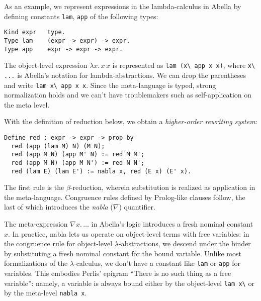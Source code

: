 \documentclass[a4paper, 11pt,titlepage, openright, twoside]{report}
\newcommand{\+}{\enspace}
\begin{document}
As an example, we represent expressions in the lambda-calculus in Abella by defining constants \lstinline{lam}, \lstinline{app} of the following types:
\begin{lstlisting}
Kind expr   type.
Type lam    (expr -> expr) -> expr.
Type app    expr -> expr -> expr.
\end{lstlisting}
The object-level expression $λx.\,x\,x$ is represented as \lstinline{lam (x\ app x x)},
where \lstinline{x\ ...} is Abella's notation for lambda-abstractions.
We can drop the parentheses and write \lstinline{lam x\ app x x}.
Since the meta-language is typed, strong normalization holds and we can't have troublemakers such
as self-application on the meta level.

With the definition of reduction below, we obtain a \textit{higher-order rewriting system}:
\begin{lstlisting}
Define red : expr -> expr -> prop by
  red (app (lam M) N) (M N);
  red (app M N) (app M' N) := red M M';
  red (app M N) (app M N') := red N N';
  red (lam E) (lam E') := nabla x, red (E x) (E' x).
\end{lstlisting}
The first rule is the $β$-reduction, wherein substitution is realized as application in the meta-language.
Congruence rules defined by Prolog-like clauses follow,
the last of which introduces the \textit{nabla} ($\nabla$) quantifier.

The meta-expression $\nabla x.\,…$ in Abella's logic introduces a fresh nominal constant $x$.
In practice, nabla lets us operate on object-level terms with free variables:
in the congruence rule for object-level $λ$-abstractions,
we descend under the binder by substituting a fresh nominal constant for the bound variable.
Unlike most formalizations of the $λ$-calculus, we don't have a constant like \lstinline{lam} or \lstinline{app} for variables.
This embodies Perlis' epigram ``There is no such thing as a free variable'':
namely, a variable is always bound
either by the object-level \lstinline{lam x\}
or by the meta-level \lstinline{nabla x}.
\end{document}
